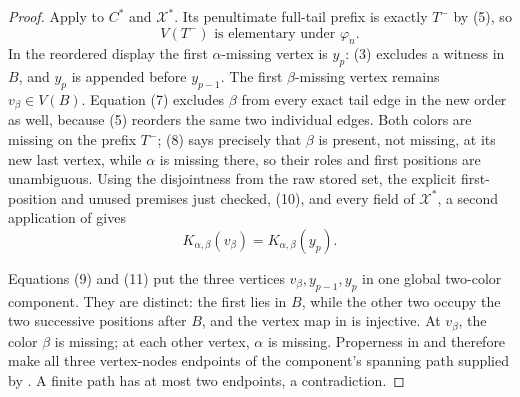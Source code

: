 \begin{proof}
Apply  to
\(C^*\) and \(\mathcal X^*\).  Its penultimate full-tail prefix is
exactly \(T^-\) by (5), so
\[
              V(T^-)\text{ is elementary under }\varphi_n. \tag{10}
\]
In the reordered display the first \(\alpha\)-missing vertex is \(y_p\):
(3) excludes a witness in \(B\), and \(y_p\) is appended before
\(y_{p-1}\).  The first \(\beta\)-missing vertex remains \(v_\beta\in
V(B)\).  Equation (7) excludes \(\beta\) from every exact tail edge in
the new order as well, because (5) reorders the same two individual
edges.  Both colors are missing on the prefix \(T^-\); (8) says precisely
that \(\beta\) is present, not missing, at its new last vertex, while
\(\alpha\) is missing there, so their roles and first positions are
unambiguous.  Using the disjointness from the raw stored set, the explicit
first-position and unused premises just checked, (10), and every field of
\(\mathcal X^*\), a second application of  gives
\[
 K_{\alpha,\beta}(v_\beta)
       =K_{\alpha,\beta}(y_p).                              \tag{11}
\]

Equations (9) and (11) put the three vertices
\(v_\beta,y_{p-1},y_p\) in one global two-color component.  They are
distinct: the first lies in \(B\), while the other two occupy the two
successive positions after \(B\), and the vertex map in
 is injective.  At \(v_\beta\), the color \(\beta\)
is missing; at each other vertex, \(\alpha\) is missing.  Properness in
 and
 therefore make all three
vertex-nodes endpoints of the component's spanning path supplied by
.  A finite path has at most two
endpoints, a contradiction.
\end{proof}
